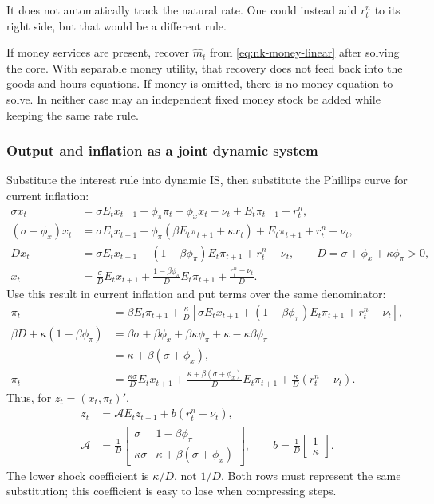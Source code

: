 It does not automatically track the natural rate. One could instead add
$r_t^n$ to its right side, but that would be a different rule.

If money services are present, recover $\hat m_t$ from
\eqref{eq:nk-money-linear} after solving the core. With separable money utility,
that recovery does not feed back into the goods and hours equations. If money
is omitted, there is no money equation to solve. In neither case may an
independent fixed money stock be added while keeping the same rate rule.

\subsubsection{Output and inflation as a joint dynamic system}

Substitute the interest rule into dynamic IS, then substitute the Phillips
curve for current inflation:
\begin{align}
 \sigma x_t&=\sigma E_tx_{t+1}-\phi_\pi\pi_t-\phi_xx_t-\nu_t
                                      +E_t\pi_{t+1}+r_t^n,\\
 (\sigma+\phi_x)x_t
 &=\sigma E_tx_{t+1}-\phi_\pi(\beta E_t\pi_{t+1}+\kappa x_t)
                                  +E_t\pi_{t+1}+r_t^n-\nu_t,\\
 D x_t&=\sigma E_tx_{t+1}+(1-\beta\phi_\pi)E_t\pi_{t+1}+r_t^n-\nu_t,
 \qquad D=\sigma+\phi_x+\kappa\phi_\pi>0,\\
 x_t&=\frac\sigma D E_tx_{t+1}
    +\frac{1-\beta\phi_\pi}{D}E_t\pi_{t+1}+\frac{r_t^n-\nu_t}{D}.
\end{align}
Use this result in current inflation and put terms over the same denominator:
\begin{align}
 \pi_t&=\beta E_t\pi_{t+1}
      +\frac\kappa D[\sigma E_tx_{t+1}
        +(1-\beta\phi_\pi)E_t\pi_{t+1}+r_t^n-\nu_t],\\
 \beta D+\kappa(1-\beta\phi_\pi)
 &=\beta\sigma+\beta\phi_x+\beta\kappa\phi_\pi
                             +\kappa-\kappa\beta\phi_\pi\\
 &=\kappa+\beta(\sigma+\phi_x),\\
 \pi_t&=\frac{\kappa\sigma}{D}E_tx_{t+1}
    +\frac{\kappa+\beta(\sigma+\phi_x)}D E_t\pi_{t+1}
    +\frac\kappa D(r_t^n-\nu_t).
\end{align}
Thus, for $z_t=(x_t,\pi_t)'$,
\begin{align}
 z_t&=\mathcal A E_tz_{t+1}+b(r_t^n-\nu_t),\label{eq:nk-matrix}\\
 \mathcal A&=\frac1D
 \begin{bmatrix}\sigma&1-\beta\phi_\pi\\
 \kappa\sigma&\kappa+\beta(\sigma+\phi_x)\end{bmatrix},
 \qquad b=\frac1D\begin{bmatrix}1\\\kappa\end{bmatrix}.
\end{align}
The lower shock coefficient is $\kappa/D$, not $1/D$. Both rows must represent
the same substitution; this coefficient is easy to lose when compressing steps.

